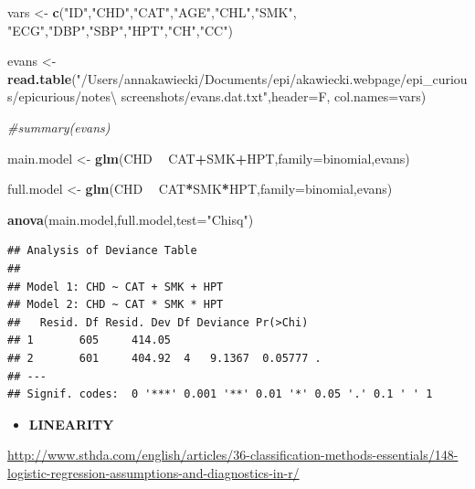 \documentclass[
]{article}
\newenvironment{Shaded}{\begin{snugshade}}{\end{snugshade}}
\newcommand{\CommentTok}[1]{\textcolor[rgb]{0.56,0.35,0.01}{\textit{#1}}}
\newcommand{\DataTypeTok}[1]{\textcolor[rgb]{0.13,0.29,0.53}{#1}}
\newcommand{\KeywordTok}[1]{\textcolor[rgb]{0.13,0.29,0.53}{\textbf{#1}}}
\newcommand{\NormalTok}[1]{#1}
\newcommand{\OperatorTok}[1]{\textcolor[rgb]{0.81,0.36,0.00}{\textbf{#1}}}
\newcommand{\StringTok}[1]{\textcolor[rgb]{0.31,0.60,0.02}{#1}}
\providecommand{\tightlist}{%
  \setlength{\itemsep}{0pt}\setlength{\parskip}{0pt}}
\begin{document}
\begin{Shaded}
\begin{Highlighting}[]
\NormalTok{vars <-}\StringTok{ }\KeywordTok{c}\NormalTok{(}\StringTok{"ID"}\NormalTok{,}\StringTok{"CHD"}\NormalTok{,}\StringTok{"CAT"}\NormalTok{,}\StringTok{"AGE"}\NormalTok{,}\StringTok{"CHL"}\NormalTok{,}\StringTok{"SMK"}\NormalTok{, }\StringTok{"ECG"}\NormalTok{,}\StringTok{"DBP"}\NormalTok{,}\StringTok{"SBP"}\NormalTok{,}\StringTok{"HPT"}\NormalTok{,}\StringTok{"CH"}\NormalTok{,}\StringTok{"CC"}\NormalTok{)}

\NormalTok{evans <-}\StringTok{ }\KeywordTok{read.table}\NormalTok{(}\StringTok{"/Users/annakawiecki/Documents/epi/akawiecki.webpage/epi_curious/epicurious/notes\textbackslash{} screenshots/evans.dat.txt"}\NormalTok{,}\DataTypeTok{header=}\NormalTok{F, }\DataTypeTok{col.names=}\NormalTok{vars)}

\CommentTok{#summary(evans)}

\NormalTok{main.model <-}\StringTok{ }\KeywordTok{glm}\NormalTok{(CHD }\OperatorTok{~}\StringTok{ }\NormalTok{CAT}\OperatorTok{+}\NormalTok{SMK}\OperatorTok{+}\NormalTok{HPT,}\DataTypeTok{family=}\NormalTok{binomial,evans) }

\NormalTok{full.model <-}\StringTok{ }\KeywordTok{glm}\NormalTok{(CHD }\OperatorTok{~}\StringTok{ }\NormalTok{CAT}\OperatorTok{*}\NormalTok{SMK}\OperatorTok{*}\NormalTok{HPT,}\DataTypeTok{family=}\NormalTok{binomial,evans)}

\KeywordTok{anova}\NormalTok{(main.model,full.model,}\DataTypeTok{test=}\StringTok{"Chisq"}\NormalTok{)}
\end{Highlighting}
\end{Shaded}

\begin{verbatim}
## Analysis of Deviance Table
## 
## Model 1: CHD ~ CAT + SMK + HPT
## Model 2: CHD ~ CAT * SMK * HPT
##   Resid. Df Resid. Dev Df Deviance Pr(>Chi)  
## 1       605     414.05                       
## 2       601     404.92  4   9.1367  0.05777 .
## ---
## Signif. codes:  0 '***' 0.001 '**' 0.01 '*' 0.05 '.' 0.1 ' ' 1
\end{verbatim}

\begin{itemize}
\tightlist
\item
  \textbf{LINEARITY}
\end{itemize}

\url{http://www.sthda.com/english/articles/36-classification-methods-essentials/148-logistic-regression-assumptions-and-diagnostics-in-r/}
\end{document}
